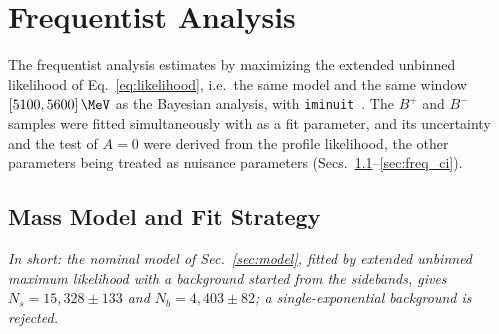 \section{Frequentist Analysis}
\label{sec:frequentist}

The frequentist analysis estimates \Araw by maximizing the extended unbinned likelihood of Eq.~\eqref{eq:likelihood}, i.e.\ the same model and the same window $[5100,5600]\,\MeV$ as the Bayesian analysis, with \texttt{iminuit}~\cite{iminuit}. The $B^+$ and $B^-$ samples were fitted simultaneously with \Araw as a fit parameter, and its uncertainty and the test of $A=0$ were derived from the profile likelihood, the other parameters being treated as nuisance parameters (Secs.~\ref{sec:freq_model}--\ref{sec:freq_ci}).


\subsection{Mass Model and Fit Strategy}
\label{sec:freq_model}
\emph{In short: the nominal model of Sec.~\ref{sec:model}, fitted by extended unbinned maximum likelihood with a background started from the sidebands, gives $N_s=15{,}328\pm133$ and $N_b=4{,}403\pm82$; a single-exponential background is rejected.}

